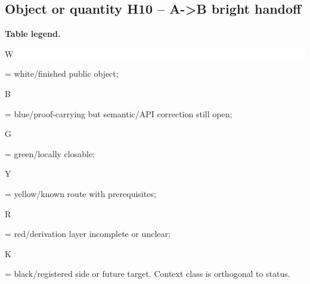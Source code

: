 \subsection*{Object or quantity H10 -- A->B bright handoff}
\hypertarget{objproof:H10}{}
\par\smallskip\noindent\begin{minipage}{0.99\linewidth}\footnotesize\raggedright\textbf{Table legend.} \colorbox{white}{\strut W} = white/finished public object; \colorbox{cyan!20}{\strut B} = blue/proof-carrying but semantic/API correction still open; \colorbox{green!18}{\strut G} = green/locally closable; \colorbox{yellow!25}{\strut Y} = yellow/known route with prerequisites; \colorbox{red!20}{\strut R} = red/derivation layer incomplete or unclear; \colorbox{black!18}{\strut K} = black/registered side or future target. Context class is orthogonal to status.\end{minipage}\par\vspace{0.25em}
